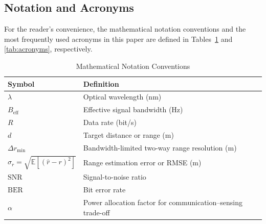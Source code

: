 \documentclass[lettersize,journal]{IEEEtran}
\begin{document}
\subsection{Notation and Acronyms}

For the reader's convenience, the mathematical notation conventions and the most frequently used acronyms in this paper are defined in Tables~\ref{tab:math_notation} and \ref{tab:acronyms}, respectively.
\begin{table}[!t]
\caption{Mathematical Notation Conventions}
\label{tab:math_notation}
\centering
\footnotesize
\begin{tabularx}{\columnwidth}{@{}>{\raggedright\arraybackslash}p{} >{\raggedright\arraybackslash}X@{}}
\toprule
\textbf{Symbol} & \textbf{Definition} \\
\midrule
$\lambda$ & Optical wavelength (nm) \\
$B_{\mathrm{eff}}$ & Effective signal bandwidth (Hz) \\
$R$ & Data rate (bit/s) \\
$d$ & Target distance or range (m) \\
$\Delta r_{\min}$ & Bandwidth-limited two-way range resolution (m) \\
$\sigma_r = \sqrt{\mathbb{E}[(\hat r - r)^2]}$ & Range estimation error or RMSE (m) \\
$\mathrm{SNR}$ & Signal-to-noise ratio \\
$\mathrm{BER}$ & Bit error rate \\
$\alpha$ & Power allocation factor for communication--sensing trade-off \\
\bottomrule
\end{tabularx}
\end{table}
\end{document}
